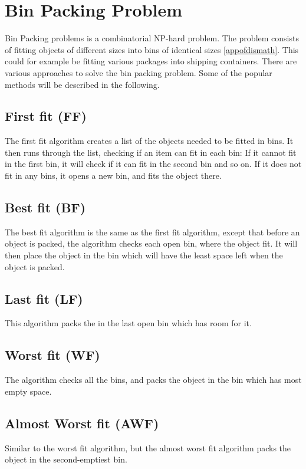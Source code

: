 \section{Bin Packing Problem}
\label{sec:binpacking}
Bin Packing problems is a combinatorial NP-hard problem. The problem consists of fitting objects of different sizes into bins of identical sizes \ref{appofdismath}. This could for example be fitting various packages into shipping containers. There are various approaches to solve the bin packing problem. Some of the popular methods will be described in the following. 

\subsection{First fit (FF)}
The first fit algorithm creates a list of the objects needed to be fitted in bins. It then runs through the list, checking if an item can fit in each bin: If it cannot fit in the first bin, it will check if it can fit in the second bin and so on. If it does not fit in any bins, it opens a new bin, and fits the object there. 

\subsection{Best fit (BF)}
The best fit algorithm is the same as the first fit algorithm, except that before an object is packed, the algorithm checks each open bin, where the object fit. It will then place the object in the bin which will have the least space left when the object is packed. 

\subsection{Last fit (LF)}
This algorithm packs the in the last open bin which has room for it.

\subsection{Worst fit (WF)}
The algorithm checks all the bins, and packs the object in the bin which has most empty space.

\subsection{Almost Worst fit (AWF)}
Similar to the worst fit algorithm, but the almost worst fit algorithm packs the object in the second-emptiest bin. 

